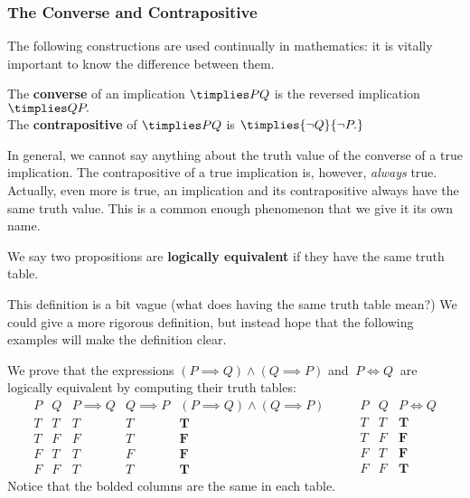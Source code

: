 \subsubsection*{The Converse and Contrapositive}

The following constructions are used continually in mathematics: it is vitally important to know the difference between them.

\begin{defn}\label{defn:contra}
The \textbf{converse} of an implication $\timplies PQ$ is the reversed implication $\timplies Q{P.}$\\
The \textbf{contrapositive} of $\timplies PQ$ is $\timplies{\neg Q}{\neg P.}$
\end{defn}

\noindent In general, we cannot say anything about the truth value of the converse of a true implication. The contrapositive of a true implication is, however, \emph{always} true. Actually, even more is true, an implication and its contrapositive always have the same truth value. This is a common enough phenomenon that we give it its own name.

\begin{defn}\label{defn:logequiv}
We say two propositions are \textbf{logically equivalent} if they have the same truth table.
\end{defn}

\noindent This definition is a bit vague (what does having the same truth table mean?) We could give a more rigorous definition, but instead hope that the following examples will make the definition clear.

\begin{example}
We prove that the expressions $(P\implies Q) \wedge (Q\implies P)$ and $\ P\iff Q\ $ are logically equivalent by computing their truth tables:
\[
\begin{array}{cc|c|c|c}
P & Q & P\implies Q & Q \implies P & (P \implies Q) \land (Q \implies P) \\
\hline
T & T & T & T & \mathbf T \\
T & F & F & T & \mathbf F \\
F & T & T & F & \mathbf F \\
F & F & T & T & \mathbf T
\end{array} \qquad \begin{array}{cc|c}
P & Q & P \iff Q \\
\hline
T & T & \mathbf T \\
T & F & \mathbf F \\
F & T & \mathbf F \\
F & F & \mathbf T 
\end{array}
\]
Notice that the bolded columns are the same in each table.
\end{example}

